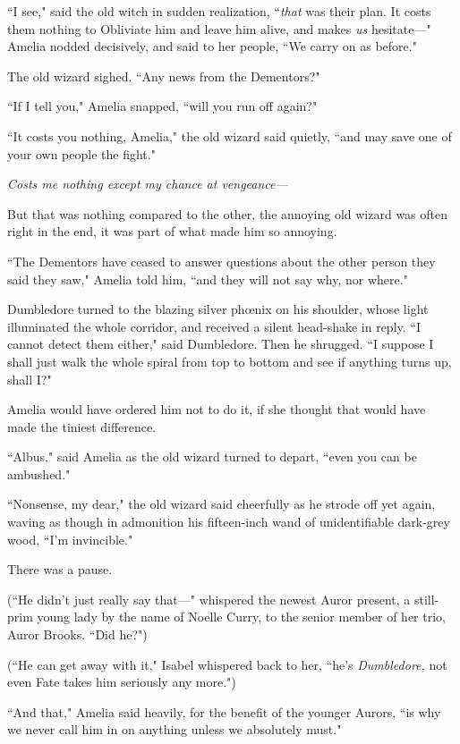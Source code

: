 ``I see," said the old witch in sudden realization, ``\emph{that} was their plan. It costs them nothing to Obliviate him and leave him alive, and makes \emph{us} hesitate—" Amelia nodded decisively, and said to her people, ``We carry on as before."

The old wizard sighed. ``Any news from the Dementors?"

``If I tell you," Amelia snapped, ``will you run off again?"

``It costs you nothing, Amelia," the old wizard said quietly, ``and may save one of your own people the fight."

\emph{Costs me nothing except my chance at vengeance—}

But that was nothing compared to the other, the annoying old wizard was often right in the end, it was part of what made him so annoying.

``The Dementors have ceased to answer questions about the other person they said they saw," Amelia told him, ``and they will not say why, nor where."

Dumbledore turned to the blazing silver phœnix on his shoulder, whose light illuminated the whole corridor, and received a silent head-shake in reply. ``I cannot detect them either," said Dumbledore. Then he shrugged. ``I suppose I shall just walk the whole spiral from top to bottom and see if anything turns up, shall I?"

Amelia would have ordered him not to do it, if she thought that would have made the tiniest difference.

``Albus," said Amelia as the old wizard turned to depart, ``even you can be ambushed."

``Nonsense, my dear," the old wizard said cheerfully as he strode off yet again, waving as though in admonition his fifteen-inch wand of unidentifiable dark-grey wood, ``I'm invincible."

There was a pause.

(``He didn't just really say that—" whispered the newest Auror present, a still-prim young lady by the name of Noelle Curry, to the senior member of her trio, Auror Brooks. ``Did he?")

(``He can get away with it," Isabel whispered back to her, ``he's \emph{Dumbledore,} not even Fate takes him seriously any more.")

``And that," Amelia said heavily, for the benefit of the younger Aurors, ``is why we never call him in on anything unless we absolutely must."

